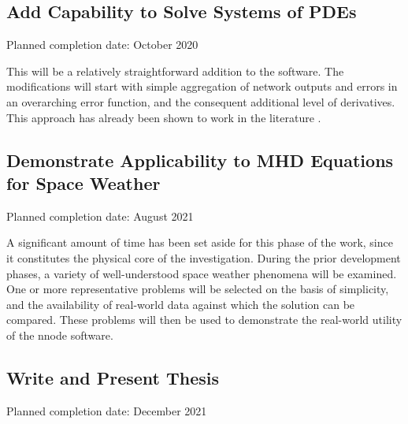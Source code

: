 \documentclass{article}
\begin{document}
\subsection{Add Capability to Solve Systems of PDEs}

Planned completion date: October 2020

This will be a relatively straightforward addition to the software. The modifications will start with simple aggregation of network outputs and errors in an overarching error function, and the consequent additional level of derivatives. This approach has already been shown to work in the literature \cite{Lagaris1998}.

\subsection{Demonstrate Applicability to MHD Equations for Space Weather}

Planned completion date: August 2021

A significant amount of time has been set aside for this phase of the work, since it constitutes the physical core of the investigation. During the prior development phases, a variety of well-understood space weather phenomena will be examined. One or more representative problems will be selected on the basis of simplicity, and the availability of real-world data against which the solution can be compared. These problems will then be used to demonstrate the real-world utility of the nnode software.

\subsection{Write and Present Thesis}

Planned completion date: December 2021


\medskip


\end{document}
